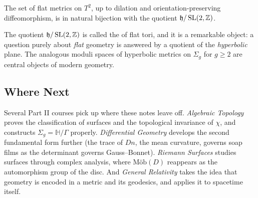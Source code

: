 \documentclass[a4paper]{scrartcl}
\newcommand{\Mob}{\text{M\"ob}}
\newcommand{\HH}{\mathbb{H}}
\begin{document}
\begin{theorem}
    The set of flat metrics on $T^2$, up to dilation and orientation-preserving diffeomorphism, is in natural bijection with the quotient $\mathfrak{h} / \operatorname{SL}(2, \mathbb{Z})$.
\end{theorem}

The quotient $\mathfrak{h}/\operatorname{SL}(2,\mathbb{Z})$ is called the  of flat tori, and it is a remarkable object: a question purely about \emph{flat} geometry is answered by a quotient of the \emph{hyperbolic} plane. The analogous moduli spaces of hyperbolic metrics on $\Sigma_g$ for $g \geq 2$ are central objects of modern geometry.

\subsection*{Where Next}

Several Part II courses pick up where these notes leave off. \emph{Algebraic Topology} proves the classification of surfaces and the topological invariance of $\chi$, and constructs $\Sigma_g = \HH/\Gamma$ properly. \emph{Differential Geometry} develops the second fundamental form further (the trace of $Dn$, the mean curvature, governs soap films as the determinant governs Gauss--Bonnet). \emph{Riemann Surfaces} studies surfaces through complex analysis, where $\Mob(D)$ reappears as the automorphism group of the disc. And \emph{General Relativity} takes the idea that geometry is encoded in a metric and its geodesics, and applies it to spacetime itself.
\end{document}
